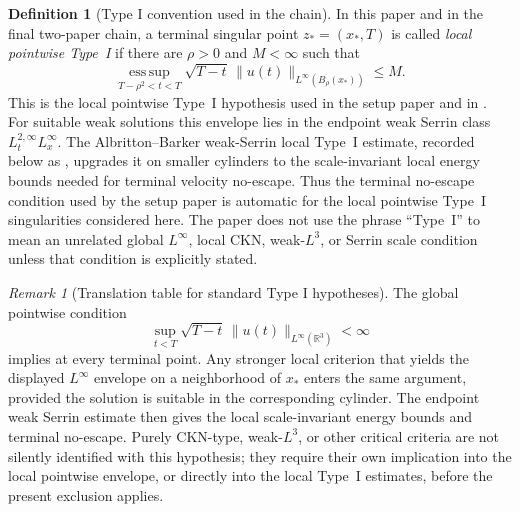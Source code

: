 \documentclass[11pt]{amsart}
\numberwithin{equation}{section}
\theoremstyle{plain}
\theoremstyle{definition}
\newtheorem{definition}[theorem]{Definition}
\theoremstyle{remark}
\newtheorem{remark}[theorem]{Remark}
\newcommand{\esssup}{\operatorname*{ess\,sup}}
\begin{document}
\begin{definition}[Type I convention used in the chain]
\label{def:pointwise-typeI-convention}
In this paper and in the final two-paper chain, a terminal singular point
\(z_*=(x_*,T)\) is called \emph{local pointwise Type~I} if there are
\(\rho>0\) and \(M<\infty\) such that
\[
   \esssup_{T-\rho^2<t<T}
   \sqrt{T-t}\,\|u(t)\|_{L^\infty(B_\rho(x_*))}\le M .
\]
This is the local pointwise Type~I hypothesis used in the setup paper and in
.  For suitable weak solutions this envelope lies
in the endpoint weak Serrin class \(L^{2,\infty}_tL^\infty_x\).  The
Albritton--Barker weak-Serrin local Type~I estimate, recorded below as
, upgrades it on smaller cylinders to
the scale-invariant local energy bounds needed for terminal velocity
no-escape.  Thus the terminal no-escape condition used by the setup paper is
automatic for the local pointwise Type~I singularities considered here.
The paper does not use the phrase ``Type~I'' to mean an unrelated global
\(L^\infty\), local CKN, weak-\(L^3\), or Serrin scale condition unless that
condition is explicitly stated.
\end{definition}

\begin{remark}[Translation table for standard Type I hypotheses]
\label{rem:typeI-translation-table}
The global pointwise condition
\[
   \sup_{t<T}\sqrt{T-t}\,
      \|u(t)\|_{L^\infty(\mathbb R^3)}<\infty
\]
implies  at every terminal point.  Any
stronger local criterion that yields the displayed \(L^\infty\) envelope on a
neighborhood of \(x_*\) enters the same argument, provided the solution is
suitable in the corresponding cylinder.  The endpoint weak Serrin estimate then
gives the local scale-invariant energy bounds and terminal no-escape.
Purely CKN-type, weak-\(L^3\), or other critical criteria are not silently
identified with this hypothesis; they require their own implication into the
local pointwise envelope, or directly into the local Type~I estimates, before the
present exclusion applies.
\end{remark}
\end{document}
